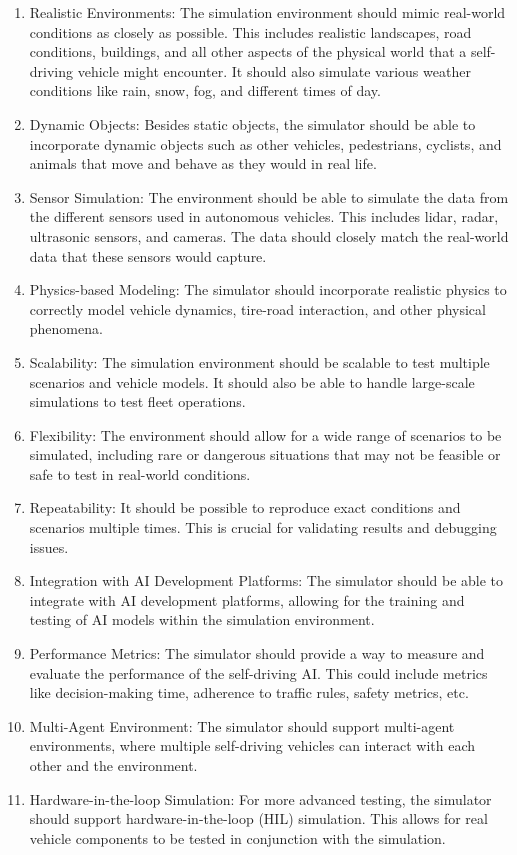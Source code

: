 \begin{enumerate}
\item Realistic Environments: The simulation environment should mimic real-world conditions as closely as possible. This includes realistic landscapes, road conditions, buildings, and all other aspects of the physical world that a self-driving vehicle might encounter. It should also simulate various weather conditions like rain, snow, fog, and different times of day.
\item Dynamic Objects: Besides static objects, the simulator should be able to incorporate dynamic objects such as other vehicles, pedestrians, cyclists, and animals that move and behave as they would in real life.
\item Sensor Simulation: The environment should be able to simulate the data from the different sensors used in autonomous vehicles. This includes lidar, radar, ultrasonic sensors, and cameras. The data should closely match the real-world data that these sensors would capture.
\item Physics-based Modeling: The simulator should incorporate realistic physics to correctly model vehicle dynamics, tire-road interaction, and other physical phenomena.
\item Scalability: The simulation environment should be scalable to test multiple scenarios and vehicle models. It should also be able to handle large-scale simulations to test fleet operations.
\item Flexibility: The environment should allow for a wide range of scenarios to be simulated, including rare or dangerous situations that may not be feasible or safe to test in real-world conditions.
\item Repeatability: It should be possible to reproduce exact conditions and scenarios multiple times. This is crucial for validating results and debugging issues.
\item Integration with AI Development Platforms: The simulator should be able to integrate with AI development platforms, allowing for the training and testing of AI models within the simulation environment.
\item Performance Metrics: The simulator should provide a way to measure and evaluate the performance of the self-driving AI. This could include metrics like decision-making time, adherence to traffic rules, safety metrics, etc.
\item Multi-Agent Environment: The simulator should support multi-agent environments, where multiple self-driving vehicles can interact with each other and the environment.
\item Hardware-in-the-loop Simulation: For more advanced testing, the simulator should support hardware-in-the-loop (HIL) simulation. This allows for real vehicle components to be tested in conjunction with the simulation.
\end{enumerate}

